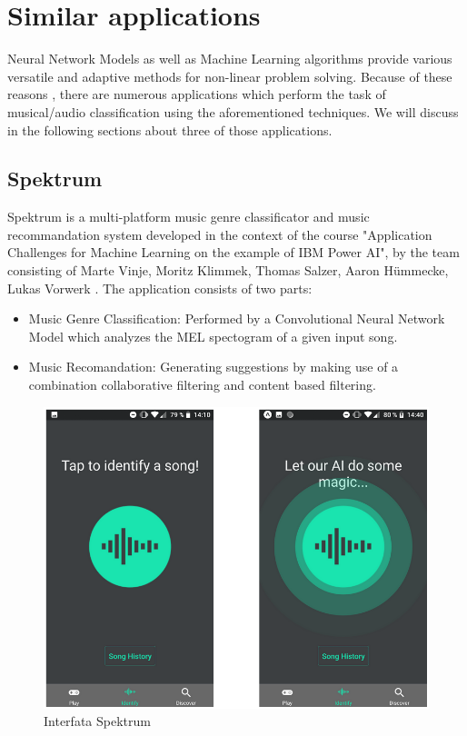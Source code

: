 \chapter{Similar applications}

Neural Network Models as well as Machine Learning algorithms provide various versatile and adaptive methods for non-linear problem solving. Because of these reasons , there are numerous applications which perform the task of musical/audio classification using the aforementioned techniques. We will discuss in the following sections about three of those applications.

\section{Spektrum}

Spektrum is a multi-platform music genre classificator and music recommandation system developed in the context of the course "Application Challenges for
Machine Learning on the example of IBM Power AI", by the team consisting of Marte Vinje, Moritz Klimmek, Thomas Salzer, Aaron Hümmecke, Lukas Vorwerk \cite{spektrum} . The application consists of two parts:
\begin{itemize}
	\item Music Genre Classification: Performed by a Convolutional Neural Network Model which analyzes the MEL spectogram of a given input song.
	\item Music Recomandation: Generating suggestions by making use of a combination collaborative filtering
		and content based filtering.
\end{itemize}

\begin{figure}[H]
	\centering
	\includegraphics{images/spektrum.png}
	\caption{Interfata Spektrum}
\label{ANN}
\end{figure}



